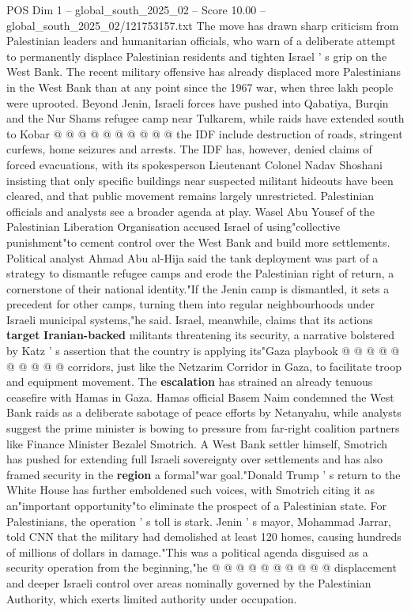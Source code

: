\begin{textsample}{POS Dim 1 – global\_south\_2025\_02 – Score 10.00 – global\_south\_2025\_02/121753157.txt}
The move has drawn sharp criticism from Palestinian leaders and humanitarian officials, who warn of a deliberate attempt to permanently displace Palestinian residents and tighten Israel ' s grip on the West Bank.
The recent military offensive has already displaced more Palestinians in the West Bank than at any point since the 1967 war, when three lakh people were uprooted.
Beyond Jenin, Israeli forces have pushed into Qabatiya, Burqin and the Nur Shams refugee camp near Tulkarem, while raids have extended south to Kobar @ @ @ @ @ @ @ @ @ @ the IDF include destruction of roads, stringent curfews, home seizures and arrests.
The IDF has, however, denied claims of forced evacuations, with its spokesperson Lieutenant Colonel Nadav Shoshani insisting that only specific buildings near suspected militant hideouts have been cleared, and that public movement remains largely unrestricted.
Palestinian officials and analysts see a broader agenda at play.
Wasel Abu Yousef of the Palestinian Liberation Organisation accused Israel of using"collective punishment"to cement control over the West Bank and build more settlements.
Political analyst Ahmad Abu al-Hija said the tank deployment was part of a strategy to dismantle refugee camps and erode the Palestinian right of return, a cornerstone of their national identity."If the Jenin camp is dismantled, it sets a precedent for other camps, turning them into regular neighbourhoods under Israeli municipal systems,"he said.
Israel, meanwhile, claims that its actions \textbf{target} \textbf{Iranian-backed} militants threatening its security, a narrative bolstered by Katz ' s assertion that the country is applying its"Gaza playbook @ @ @ @ @ @ @ @ @ @ corridors, just like the Netzarim Corridor in Gaza, to facilitate troop and equipment movement.
The \textbf{escalation} has strained an already tenuous ceasefire with Hamas in Gaza.
Hamas official Basem Naim condemned the West Bank raids as a deliberate sabotage of peace efforts by Netanyahu, while analysts suggest the prime minister is bowing to pressure from far-right coalition partners like Finance Minister Bezalel Smotrich.
A West Bank settler himself, Smotrich has pushed for extending full Israeli sovereignty over settlements and has also framed security in the \textbf{region} a formal"war goal."Donald Trump ' s return to the White House has further emboldened such voices, with Smotrich citing it as an"important opportunity"to eliminate the prospect of a Palestinian state.
For Palestinians, the operation ' s toll is stark.
Jenin ' s mayor, Mohammad Jarrar, told CNN that the military had demolished at least 120 homes, causing hundreds of millions of dollars in damage."This was a political agenda disguised as a security operation from the beginning,"he @ @ @ @ @ @ @ @ @ @ displacement and deeper Israeli control over areas nominally governed by the Palestinian Authority, which exerts limited authority under occupation.

\end{textsample}
